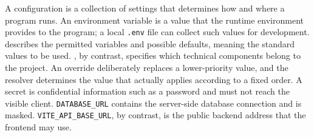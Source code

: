 \begin{beginnerstatement}

A configuration is a collection of settings that determines how and where a
program runs. An environment variable is a value that the runtime environment
provides to the program; a local \texttt{.env} file can collect such values for
development.  describes the permitted variables and
possible defaults, meaning the standard values to be used.
, by contrast, specifies which technical components
belong to the project. An override deliberately replaces a lower-priority value,
and the resolver determines the value that actually applies according to a
fixed order. A secret is confidential information such as a password and must
not reach the visible client. \texttt{DATABASE\_URL} contains the server-side
database connection and is masked. \texttt{VITE\_API\_BASE\_URL}, by contrast,
is the public backend address that the frontend may use.

\end{beginnerstatement}
